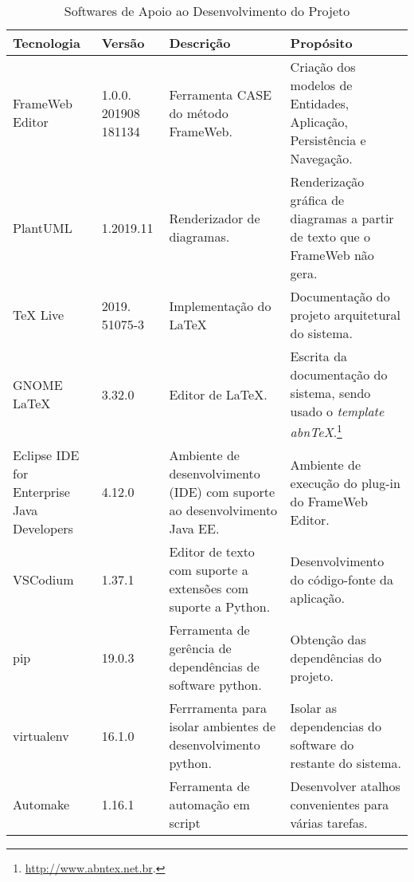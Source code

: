\begin{table}[h]
	\centering	
	\vspace{0.5cm}
	\caption{Softwares de Apoio ao Desenvolvimento do Projeto}	
	\label{tabela-software}
	\begin{tabular}{|p{3cm}|p{1.5cm}|p{5cm}|p{6cm}|}  \hline 
	
 		Tecnologia & Versão & Descrição & Propósito \\\hline 
 		 
		FrameWeb Editor & 1.0.0. 201908 181134 & Ferramenta CASE do método FrameWeb. & Criação dos modelos de Entidades, Aplicação, Persistência e Navegação. \\\hline 
 		 
		PlantUML & 1.2019.11 & Renderizador de diagramas. & Renderização gráfica de diagramas a partir de texto que o FrameWeb não gera. \\ \hline

		TeX Live  & 2019. 51075-3 & Implementação do \LaTeX & Documentação do projeto arquitetural do sistema. \\\hline       
		
		GNOME \LaTeX & 3.32.0 & Editor de LaTeX. &  Escrita da documentação do sistema, sendo usado o \textit{template} \textit{abnTeX}.\footnote{\url{http://www.abntex.net.br}.} \\\hline    

		Eclipse IDE for Enterprise Java Developers & 4.12.0 & Ambiente de desenvolvimento (IDE) com suporte ao desenvolvimento Java EE. & Ambiente de execução do plug-in do FrameWeb Editor. \\\hline 
		
		VSCodium & 1.37.1 & Editor de texto com suporte a extensões com suporte a Python. & Desenvolvimento do código-fonte da aplicação. \\\hline
		
		pip & 19.0.3 & Ferramenta de gerência de dependências de software python. & Obtenção das dependências do projeto. \\\hline
		
		virtualenv & 16.1.0 & Ferrramenta para isolar ambientes de desenvolvimento python. & Isolar as dependencias do software do restante do sistema.  \\ \hline
		
		Automake & 1.16.1 & Ferramenta de automação em script & Desenvolver atalhos convenientes para várias tarefas. \\ \hline 
		
	\end{tabular}
\end{table}

